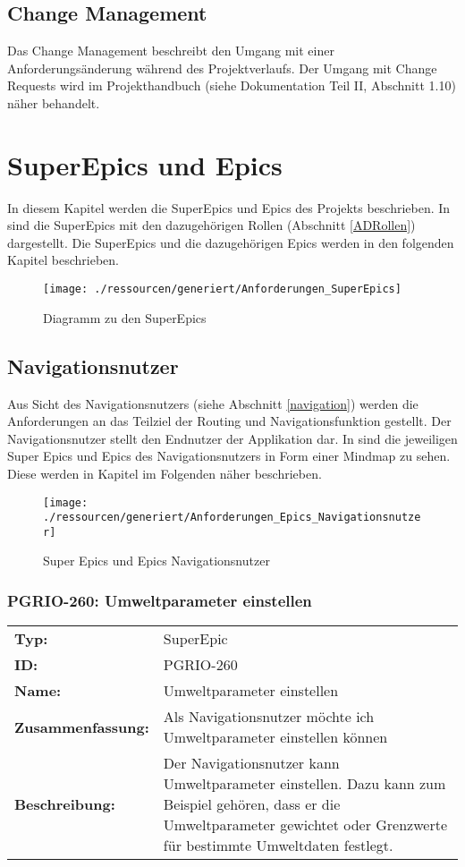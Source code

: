 \subsection{Change Management}\label{ADChangemanagement}
Das Change Management beschreibt den Umgang mit einer Anforderungsänderung während des Projektverlaufs. Der Umgang mit Change Requests wird im Projekthandbuch (siehe Dokumentation Teil II, Abschnitt 1.10) näher behandelt.

\section{SuperEpics und Epics}\label{ADSuperEpicsAndEpics}
In diesem Kapitel werden die SuperEpics und Epics des Projekts beschrieben. In  sind die SuperEpics mit den dazugehörigen Rollen (Abschnitt \ref{ADRollen}) dargestellt. Die SuperEpics und die dazugehörigen Epics werden in den folgenden Kapitel beschrieben.

\begin{figure}[!htb]
	\centering
	\texttt{[image: ./ressourcen/generiert/Anforderungen\_SuperEpics]}
	\caption{Diagramm zu den SuperEpics}
	\label{fig:SuperEpics}
\end{figure}

\subsection{Navigationsnutzer}
Aus Sicht des Navigationsnutzers (siehe Abschnitt \ref{navigation}) werden die Anforderungen an das Teilziel der Routing und Navigationsfunktion gestellt. Der Navigationsnutzer stellt den Endnutzer der Applikation dar. In  sind die jeweiligen Super Epics und Epics des Navigationsnutzers in Form einer Mindmap zu sehen. Diese werden in Kapitel im Folgenden näher beschrieben.
\begin{figure}[H]
	\centering
	\texttt{[image: ./ressourcen/generiert/Anforderungen\_Epics\_Navigationsnutzer]}
	\caption{Super Epics und Epics Navigationsnutzer}
	\label{fig:NavigatiosnutzerEpics}
\end{figure}

\subsubsection{PGRIO-260: Umweltparameter einstellen} 
\begin{flushleft} 
\begin{tabular}{@{}lp{100mm}} 
\textbf{Typ:} & SuperEpic \\ 
\textbf{ID:} & PGRIO-260 \\ 
\textbf{Name:} & Umweltparameter einstellen \\ 
\textbf{Zusammenfassung:} & Als Navigationsnutzer möchte ich Umweltparameter einstellen können \\ 
\textbf{Beschreibung:} & Der Navigationsnutzer kann Umweltparameter einstellen. Dazu kann zum Beispiel gehören, dass er die Umweltparameter gewichtet oder Grenzwerte für bestimmte Umweltdaten festlegt. \\ 
\end{tabular} 
\end{flushleft} 

